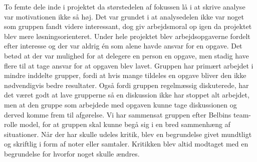 To femte dele inde i projektet da størstedelen af fokussen lå i at skrive analyse var motivationen ikke så høj. Det var grundet i at analysedelen ikke var noget som gruppen fandt videre interessant, dog giv arbejdsmoral op igen da projektet blev mere løsningsorienteret. Under hele projektet blev arbejdsopgaverne fordelt efter interesse og der var aldrig én som alene havde ansvar for en opgave. Det betød at der var mulighed for at delegere en person en opgave, men stadig have flere til at tage ansvar for at opgaven blev lavet.
Gruppen har primært arbejdet i mindre inddelte grupper, fordi at hvis mange tildeles en opgave bliver den ikke nødvendigvis bedre resultater. Også fordi gruppen regelmæssig diskuterede, har det været godt at lave grupperne så en diskussion ikke har stoppet alt arbejdet, men at den gruppe som arbejdede med opgaven kunne tage diskussionen og derved komme frem til afgørelse. Vi har sammensat gruppen efter Belbins team-rolle model, for at gruppen skal kunne begå sig i en bred sammenhæng af situationer. Når der har skulle udeles kritik, blev en begrundelse givet mundtligt og skriftlig i form af noter eller samtaler. Kritikken blev altid modtaget med en begrundelse for hvorfor noget skulle ændres.